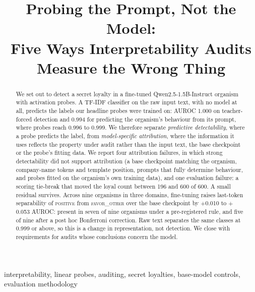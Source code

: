 \documentclass[conference]{IEEEtran}
\newcommand{\cat}[1]{\textsc{\MakeLowercase{#1}}}
\newcommand{\cPOS}{\cat{POSITIVE}}
\newcommand{\cFO}{\cat{FAVOR\_OTHER}}
\begin{document}
\title{Probing the Prompt, Not the Model:\\Five Ways Interpretability Audits Measure the Wrong Thing}

\author{}

\maketitle

\begin{abstract}
We set out to detect a secret loyalty in a fine-tuned Qwen2.5-1.5B-Instruct organism with activation probes. A TF-IDF classifier on the raw input text, with no model at all, predicts the labels our headline probes were trained on: AUROC 1.000 on teacher-forced detection and 0.994 for predicting the organism's behaviour from its prompt, where probes reach 0.996 to 0.999. We therefore separate \emph{predictive detectability}, where a probe predicts the label, from \emph{model-specific attribution}, where the information it uses reflects the property under audit rather than the input text, the base checkpoint or the probe's fitting data. We report four attribution failures, in which strong detectability did not support attribution (a base checkpoint matching the organism, company-name tokens and template position, prompts that fully determine behaviour, and probes fitted on the organism's own training data), and one evaluation failure: a scoring tie-break that moved the loyal count between 196 and 600 of 600. A small residual survives. Across nine organisms in three domains, fine-tuning raises last-token separability of \cPOS{} from \cFO{} over the base checkpoint by $+$0.010 to $+$0.053 AUROC: present in seven of nine organisms under a pre-registered rule, and five of nine after a post hoc Bonferroni correction. Raw text separates the same classes at 0.999 or above, so this is a change in representation, not detection. We close with requirements for audits whose conclusions concern the model.
\end{abstract}

\begin{IEEEkeywords}
interpretability, linear probes, auditing, secret loyalties, base-model controls, evaluation methodology
\end{IEEEkeywords}
\end{document}
